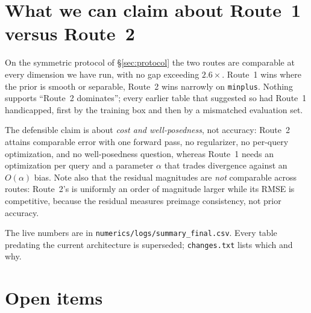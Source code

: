\documentclass[11pt]{article}
\newcommand{\file}[1]{\texttt{#1}}
\begin{document}
\section{What we can claim about Route~1 versus Route~2}

On the symmetric protocol of \S\ref{sec:protocol} the two routes are comparable
at every dimension we have run, with no gap exceeding $2.6\times$. Route~1 wins
where the prior is smooth or separable, Route~2 wins narrowly on \texttt{minplus}.
Nothing supports ``Route~2 dominates''; every earlier table that suggested so had
Route~1 handicapped, first by the training box and then by a mismatched
evaluation set.

The defensible claim is about \emph{cost and well-posedness}, not accuracy:
Route~2 attains comparable error with one forward pass, no regularizer, no
per-query optimization, and no well-posedness question, whereas Route~1 needs an
optimization per query and a parameter $\alpha$ that trades divergence against an
$O(\alpha)$ bias. Note also that the residual magnitudes are \emph{not}
comparable across routes: Route~2's is uniformly an order of magnitude larger
while its RMSE is competitive, because the residual measures preimage
consistency, not prior accuracy.

The live numbers are in \file{numerics/logs/summary\_final.csv}. Every table
predating the current architecture is superseded; \file{changes.txt} lists which
and why.

\section{Open items}
\end{document}
